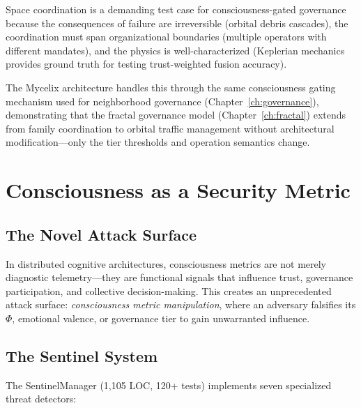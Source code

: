 \documentclass[12pt]{book}
\begin{document}
Space coordination is a demanding test case for consciousness-gated governance because the consequences of failure are irreversible (orbital debris cascades), the coordination must span organizational boundaries (multiple operators with different mandates), and the physics is well-characterized (Keplerian mechanics provides ground truth for testing trust-weighted fusion accuracy).

The Mycelix architecture handles this through the same consciousness gating mechanism used for neighborhood governance (Chapter~\ref{ch:governance}), demonstrating that the fractal governance model (Chapter~\ref{ch:fractal}) extends from family coordination to orbital traffic management without architectural modification---only the tier thresholds and operation semantics change.


\chapter{Consciousness as a Security Metric}
\label{ch:security}

\section{The Novel Attack Surface}

In distributed cognitive architectures, consciousness metrics are not merely diagnostic telemetry---they are functional signals that influence trust, governance participation, and collective decision-making. This creates an unprecedented attack surface: \textit{consciousness metric manipulation}, where an adversary falsifies its $\Phi$, emotional valence, or governance tier to gain unwarranted influence.

\section{The Sentinel System}

The SentinelManager (1,105 LOC, 120+ tests) implements seven specialized threat detectors:
\end{document}
